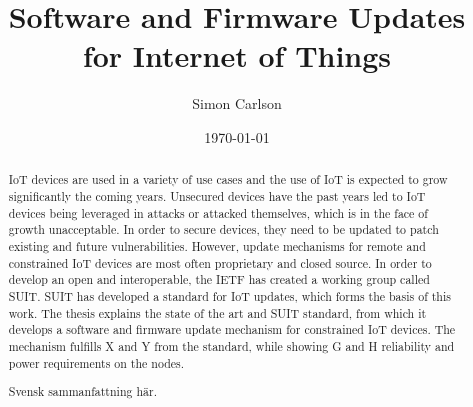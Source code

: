 \documentclass{kththesis}
\title{Software and Firmware Updates for Internet of Things}
\author{Simon Carlson}
\date{\today}
\begin{document}
\frontmatter

\titlepage

\begin{abstract}
IoT devices are used in a variety of use cases and the use of IoT is expected to grow
significantly the coming years. Unsecured devices have the past years led to IoT devices
being leveraged in attacks or attacked themselves, which is in the face of growth
unacceptable. In order to secure devices, they need to be updated to patch existing and
future vulnerabilities. However, update mechanisms for remote and constrained IoT devices
are most often proprietary and closed source. In order to develop an open and
interoperable, the IETF has created a working group called SUIT. SUIT has developed a
standard for IoT updates, which forms the basis of this work. The thesis explains the
state of the art and SUIT standard, from which it develops a software and firmware update
mechanism for constrained IoT devices. The mechanism fulfills X and Y from the standard,
while showing G and H reliability and power requirements on the nodes.

\end{abstract}


\begin{otherlanguage}{swedish}
    \begin{abstract}
        Svensk sammanfattning här.
    \end{abstract}
\end{otherlanguage}


\tableofcontents
\listoftables
\listoffigures
\lstlistoflistings

\end{document}
